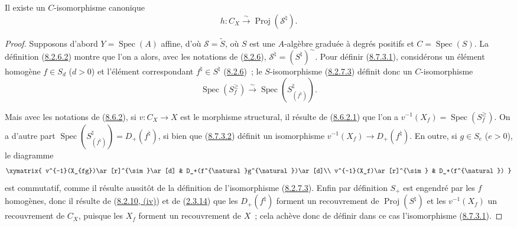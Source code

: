 \begin{proposition}[8.7.3]
\label{II.8.7.3-fr}
Il existe un $C$-isomorphisme canonique
\begin{equation}
\label{II.8.7.3.1-fr}
  h:C_X\xrightarrow{\sim}\operatorname{Proj}(\mathcal{S}^{\natural}).
\tag{8.7.3.1}
\end{equation}
\end{proposition}

\begin{proof}
Supposons d'abord $Y=\operatorname{Spec}(A)$ affine, d'où
$\mathcal{S}=\widetilde{S}$, où $S$ est une $A$-algèbre graduée à degrés
positifs et $C=\operatorname{Spec}(S)$. La définition
(\hyperref[II.8.2.6.2-fr]{8.2.6.2}) montre que l'on a alors, avec les
notations de (\hyperref[II.8.2.6-fr]{8.2.6}),
$\mathcal{S}^{\natural}=(S^{\natural})^{\sim}$. Pour définir
(\hyperref[II.8.7.3.1-fr]{8.7.3.1}), considérons un élément homogène
$f\in S_d$ ($d>0$) et l'élément correspondant $f^{\natural}\in S^{\natural}$
(\hyperref[II.8.2.6-fr]{8.2.6})~; le $S$-isomorphisme
(\hyperref[II.8.2.7.3-fr]{8.2.7.3}) définit donc un $C$-isomorphisme
\begin{equation}
\label{II.8.7.3.2-fr}
  \operatorname{Spec}(S_f^{\geqslant})
  \xrightarrow{\sim}
  \operatorname{Spec}(S_{(f^{\natural})}^{\natural}).
\tag{8.7.3.2}
\end{equation}

Mais avec les notations de (\hyperref[II.8.6.2-fr]{8.6.2}), si
$v:C_X\to X$ est le morphisme structural, il résulte de
(\hyperref[II.8.6.2.1-fr]{8.6.2.1}) que l'on a
$v^{-1}(X_f)=\operatorname{Spec}(S_f^{\geqslant})$. On a d'autre part
$\operatorname{Spec}(S_{(f^{\natural})}^{\natural})=D_+(f^{\natural})$, si
bien que (\hyperref[II.8.7.3.2-fr]{8.7.3.2}) définit un isomorphisme
$v^{-1}(X_f)\to D_+(f^{\natural})$. En outre, si $g\in S_e$ ($e>0$), le
diagramme
\[
  \xymatrix{
    v^{-1}(X_{fg})\ar[r]^{\sim}\ar[d] &
    D_+(f^{\natural}g^{\natural})\ar[d]\\
    v^{-1}(X_f)\ar[r]^{\sim} & D_+(f^{\natural})
  }
\]
est commutatif, comme il résulte aussitôt de la définition de l'isomorphisme
(\hyperref[II.8.2.7.3-fr]{8.2.7.3}). Enfin par définition $S_+$ est engendré
par les $f$ homogènes, donc il résulte de
(\hyperref[II.8.2.10-fr]{8.2.10, (iv)}) et de
(\hyperref[II.2.3.14-fr]{2.3.14}) que les $D_+(f^{\natural})$ forment un
recouvrement de $\operatorname{Proj}(S^{\natural})$ et les $v^{-1}(X_f)$ un
recouvrement de $C_X$, puisque les $X_f$ forment un recouvrement de $X$~;
cela achève donc de définir dans ce cas l'isomorphisme
(\hyperref[II.8.7.3.1-fr]{8.7.3.1}).


\end{proof}
